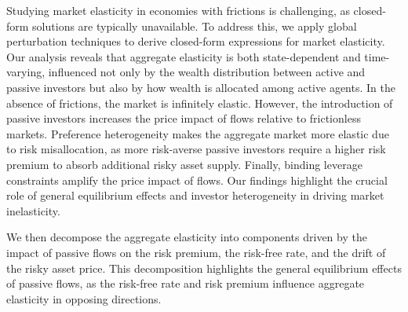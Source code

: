 Studying market elasticity in economies with frictions is challenging, as closed-form solutions are typically unavailable. To address this, we apply global perturbation techniques to derive closed-form expressions for market elasticity. Our analysis reveals that aggregate elasticity is both state-dependent and time-varying, influenced not only by the wealth distribution between active and passive investors but also by how wealth is allocated among active agents. In the absence of frictions, the market is infinitely elastic. However, the introduction of passive investors increases the price impact of flows relative to frictionless markets. Preference heterogeneity makes the aggregate market more elastic due to risk misallocation, as more risk-averse passive investors require a higher risk premium to absorb additional risky asset supply. Finally, binding leverage constraints amplify the price impact of flows. Our findings highlight the crucial role of general equilibrium effects and investor heterogeneity in driving market inelasticity.

We then decompose the aggregate elasticity into components driven by the impact of passive flows on the risk premium, the risk-free rate, and the drift of the risky asset price. This decomposition highlights the general equilibrium effects of passive flows, as the risk-free rate and risk premium influence aggregate elasticity in opposing directions.


